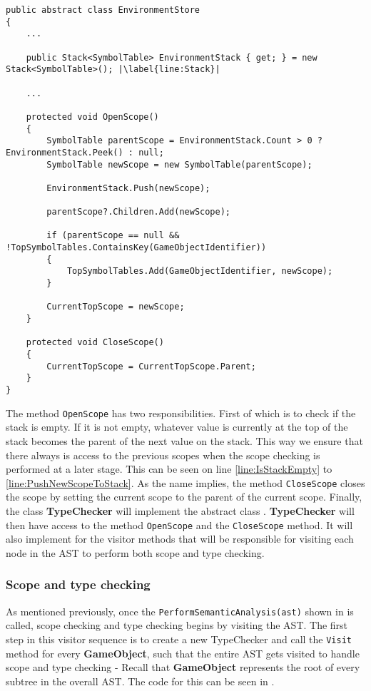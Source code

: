 \begin{lstlisting}[language=CSharp, caption={Abstract class SemanticAnalysis}, label={lst:ACSemanticAnalysis},escapechar=|]
public abstract class EnvironmentStore
{
    ...

    public Stack<SymbolTable> EnvironmentStack { get; } = new Stack<SymbolTable>(); |\label{line:Stack}|

    ...

    protected void OpenScope()
    {
        SymbolTable parentScope = EnvironmentStack.Count > 0 ? EnvironmentStack.Peek() : null;
        SymbolTable newScope = new SymbolTable(parentScope);
        
        EnvironmentStack.Push(newScope);

        parentScope?.Children.Add(newScope);

        if (parentScope == null && !TopSymbolTables.ContainsKey(GameObjectIdentifier))
        {
            TopSymbolTables.Add(GameObjectIdentifier, newScope);
        }
        
        CurrentTopScope = newScope;
    }

    protected void CloseScope()
    {
        CurrentTopScope = CurrentTopScope.Parent;
    }
}
\end{lstlisting}

The method \texttt{OpenScope} has two responsibilities. First of which is to check if the stack is empty. If it is not empty, whatever value is currently at the top of the stack becomes the parent of the next value on the stack. This way we ensure that there always is access to the previous scopes when the scope checking is performed at a later stage. This can be seen on line \ref{line:IsStackEmpty} to \ref{line:PushNewScopeToStack}.
As the name implies, the method \texttt{CloseScope} closes the scope by setting the current scope to the parent of the current scope.
Finally, the class \textbf{TypeChecker} will implement the abstract class \abstractsemanticclass{}. \textbf{TypeChecker} will then have access to the method \texttt{OpenScope} and the \texttt{CloseScope} method. It will also implement  for the visitor methods that will be responsible for visiting each node in the AST to perform both scope and type checking.

\subsubsection*{Scope and type checking}
As mentioned previously, once the \texttt{PerformSemanticAnalysis(ast)} shown in  is called, scope checking and type checking begins by visiting the AST. The first step in this visitor sequence is to create a new TypeChecker and call the \texttt{Visit} method for every \textbf{GameObject}, such that the entire AST gets visited to handle scope and type checking - Recall that \textbf{GameObject} represents the root of every subtree in the overall AST. The code for this can be seen in .

